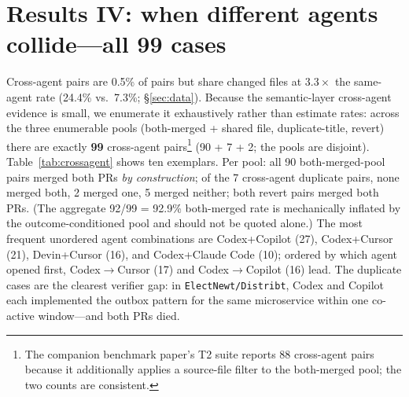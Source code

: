 \documentclass{article}
\begin{document}
\section{Results IV: when different agents collide---all 99 cases}
\label{sec:crossagent}

Cross-agent pairs are 0.5\% of pairs but share changed files at $3.3\times$ the same-agent rate (24.4\% vs.\ 7.3\%; \S\ref{sec:data}). %
Because the semantic-layer cross-agent evidence is small, we enumerate it exhaustively rather than estimate rates: across the three enumerable pools (both-merged + shared file, duplicate-title, revert) there are exactly \textbf{99} cross-agent pairs\footnote{The companion benchmark paper's T2 suite reports 88 cross-agent pairs because it additionally applies a source-file filter to the both-merged pool; the two counts are consistent.} (90 + 7 + 2; the pools are disjoint). %
Table~\ref{tab:crossagent} shows ten exemplars. Per pool: all 90 both-merged-pool pairs merged both PRs \emph{by construction}; of the 7 cross-agent duplicate pairs, none merged both, 2 merged one, 5 merged neither; both revert pairs merged both PRs. (The aggregate 92/99 = 92.9\% both-merged rate is mechanically inflated by the outcome-conditioned pool and should not be quoted alone.) %
The most frequent unordered agent combinations are Codex+Copilot (27), Codex+Cursor (21), Devin+Cursor (16), and Codex+Claude Code (10); ordered by which agent opened first, Codex$\rightarrow$Cursor (17) and Codex$\rightarrow$Copilot (16) lead. %
The duplicate cases are the clearest verifier gap: in \texttt{ElectNewt/Distribt}, Codex and Copilot each implemented the outbox pattern for the same microservice within one co-active window---and both PRs died.
\end{document}
